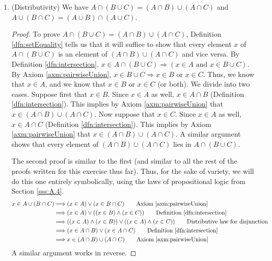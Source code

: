 \documentclass[../main.tex]{subfiles}
\begin{document}
\begin{enumerate}[ref={\thesection.\arabic*}]
\begin{prp}
\begin{enumerate}[label={\textup{(}\alph*\textup{)}},ref={\theenumi\alph*}]
\begin{proof}
            \end{proof}
            \item \label{exr:3.1.6f}(Distributivity) We have $A\cap(B\cup C)=(A\cap B)\cup(A\cap C)$ and $A\cup(B\cap C)=(A\cup B)\cap(A\cup C)$.
            \begin{proof}
                To prove $A\cap(B\cup C)=(A\cap B)\cup(A\cap C)$, Definition \ref{dfn:setEquality} tells us that it will suffice to show that every element $x$ of $A\cap(B\cup C)$ is an element of $(A\cap B)\cup(A\cap C)$ and vice versa. By Definition \ref{dfn:intersection}, $x\in A\cap(B\cup C) \Longrightarrow (x\in A\text{ and }x\in B\cup C)$. By Axiom \ref{axm:pairwiseUnion}, $x\in B\cup C \Longrightarrow x\in B\text{ or }x\in C$. Thus, we know that $x\in A$, and we know that $x\in B$ or $x\in C$ (or both). We divide into two cases. Suppose first that $x\in B$. Since $x\in A$ as well, $x\in A\cap B$ (Definition \ref{dfn:intersection}). This implies by Axiom \ref{axm:pairwiseUnion} that $x\in(A\cap B)\cup(A\cap C)$. Now suppose that $x\in C$. Since $x\in A$ as well, $x\in A\cap C$ (Definition \ref{dfn:intersection}). This implies by Axiom \ref{axm:pairwiseUnion} that $x\in(A\cap B)\cup(A\cap C)$. A similar argument shows that every element of $(A\cap B)\cup(A\cap C)$ lies in $A\cap(B\cup C)$.\par
                The second proof is similar to the first (and similar to all the rest of the proofs written for this exercise thus far). Thus, for the sake of variety, we will do this one entirely symbolically, using the laws of propositional logic from Section \ref{sss:A.4}.
                \begin{align*}
                    x\in A\cup(B\cap C) &\Longrightarrow (x\in A) \vee (x\in B\cap C)\tag*{Axiom \ref{axm:pairwiseUnion}}\\
                    &\Longrightarrow (x\in A) \vee ((x\in B) \wedge (x\in C))\tag*{Definition \ref{dfn:intersection}}\\
                    &\Longrightarrow ((x\in A) \wedge (x\in B)) \vee ((x\in A) \wedge (x\in C))\tag*{Distributive law for disjunction}\\
                    &\Longrightarrow (x\in A\cap B) \vee (x\in A\cap C)\tag*{Definition \ref{dfn:intersection}}\\
                    &\Longrightarrow x\in (A\cap B)\cup(A\cap C)\tag*{Axiom \ref{axm:pairwiseUnion}}
                \end{align*}
                A similar argument works in reverse.
            \end{proof}

\end{enumerate}
\end{prp}
\end{enumerate}
\end{document}
